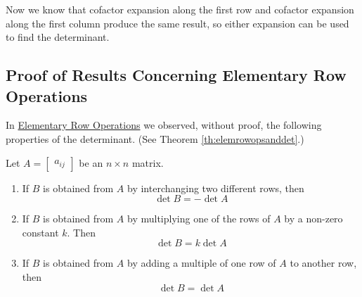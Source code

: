 \documentclass{ximera}
\begin{document}
Now we know that cofactor expansion along the first row and cofactor expansion along the first column produce the same result, so either expansion can be used to find the determinant.  

\subsection*{Proof of Results Concerning Elementary Row Operations}
In \href{https://ximera.osu.edu/linearalgebradzv3/LinearAlgebraInteractiveIntro/DET-0030/main}{Elementary Row Operations} we observed, without proof, the following properties of the determinant. (See Theorem \ref{th:elemrowopsanddet}.)

\begin{summary}
    Let $A=\begin{bmatrix}a_{ij}\end{bmatrix}$ be an $n\times n$ matrix.  
\begin{enumerate}
\item\label{item:rowswapanddetSUMM}
If $B$ is obtained from $A$ by interchanging two different rows, then $$\det{B}=-\det{A}$$
\item \label{item:rowconstantmultanddetSUMM}
If $B$ is obtained from $A$ by multiplying one of the rows of $A$ by a non-zero constant $k$.  Then $$\det{B}=k\det{A}$$
\item \label{item:addmultotherrowdetSUMM}
If $B$ is obtained from $A$ by adding a multiple of one row of $A$ to another row, then
$$\det{B}=\det{A}$$
\end{enumerate}
\end{summary}
\end{document}
